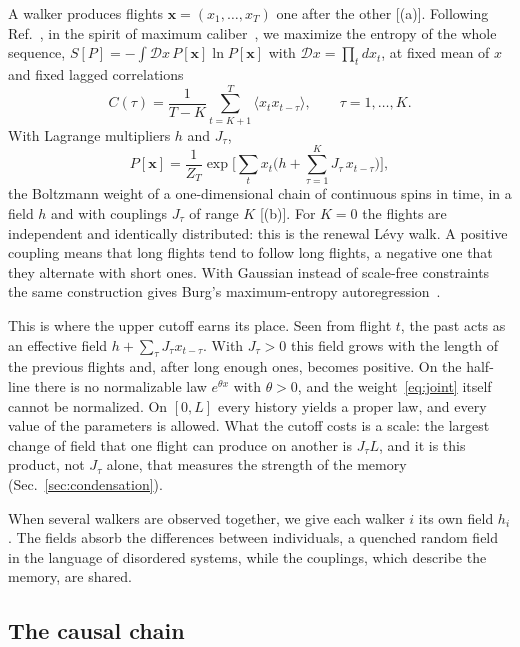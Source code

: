 A walker produces flights $\mathbf x=(x_1,\dots,x_T)$ one after the other [(a)]. Following Ref.~\cite{Agliari2024}, in the spirit of maximum caliber~\cite{Presse2013}, we maximize the entropy of the whole sequence, $S[P]=-\int\mathcal Dx\,P[\mathbf x]\ln P[\mathbf x]$ with $\mathcal Dx=\prod_tdx_t$, at fixed mean of $x$ and fixed lagged correlations
\begin{equation}
C(\tau)=\frac1{T-K}\sum_{t=K+1}^T\langle x_tx_{t-\tau}\rangle,\qquad\tau=1,\dots,K .
\end{equation}
With Lagrange multipliers $h$ and $J_\tau$,
\begin{equation}
P[\mathbf x]=\frac1{Z_T}\exp\Big[\sum_tx_t\Big(h+\sum_{\tau=1}^KJ_\tau\,x_{t-\tau}\Big)\Big],
\label{eq:joint}
\end{equation}
the Boltzmann weight of a one-dimensional chain of continuous spins in time, in a field $h$ and with couplings $J_\tau$ of range $K$ [(b)]. For $K=0$ the flights are independent and identically distributed: this is the renewal L\'evy walk. A positive coupling means that long flights tend to follow long flights, a negative one that they alternate with short ones. With Gaussian instead of scale-free constraints the same construction gives Burg's maximum-entropy autoregression~\cite{Burg1975,CoverThomas}.

This is where the upper cutoff earns its place. Seen from flight $t$, the past acts as an effective field $h+\sum_\tau J_\tau x_{t-\tau}$. With $J_\tau>0$ this field grows with the length of the previous flights and, after long enough ones, becomes positive. On the half-line there is no normalizable law $e^{\theta x}$ with $\theta>0$, and the weight~\eqref{eq:joint} itself cannot be normalized. On $[0,L]$ every history yields a proper law, and every value of the parameters is allowed. What the cutoff costs is a scale: the largest change of field that one flight can produce on another is $J_\tau L$, and it is this product, not $J_\tau$ alone, that measures the strength of the memory (Sec.~\ref{sec:condensation}).

When several walkers are observed together, we give each walker $i$ its own field $h_i$. The fields absorb the differences between individuals, a quenched random field in the language of disordered systems, while the couplings, which describe the memory, are shared.

\subsection{The causal chain}\label{sec:causal}


